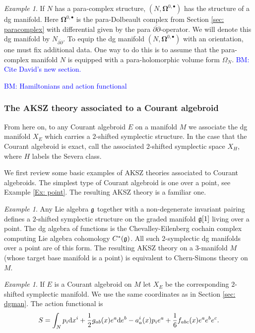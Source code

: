 \documentclass{article}
\newcommand{\p}{\partial}
\newcommand{\pd}{\overline{\p\!\!\!\p}}
\def\d{{\rm d}}
\theoremstyle{definition}
\theoremstyle{remark}
\newtheorem{Ex}[theorem]{Example}
\def\brian{\textcolor{blue}{BM: }\textcolor{blue}}
\begin{document}
\begin{Ex}
If $N$ has a para-complex structure, $(N, \mathbf{\Omega}^{0,\bullet})$ has the structure of a dg manifold. 
Here $\mathbf{\Omega}^{0,\bullet}$ is the para-Dolbeault complex from Section \ref{sec: paracomplex} with differential given by the para $\pd$-operator. 
We will denote this dg manifold by $N_{\pd}$. 
To equip the dg manifold $(N, \mathbf{\Omega}^{0,\bullet})$ with an orientation, one must fix additional data. 
One way to do this is to assume that the para-complex manifold $N$ is equipped with a para-holomorphic volume form $\Omega_N$. \brian{Cite David's new section.}
\end{Ex}

\brian{Hamiltonians and action functional}

\subsubsection{The AKSZ theory associated to a Courant algebroid}

From here on, to any Courant algebroid $E$ on a manifold $M$ we associate the dg manifold $X_E$ which carries a $2$-shifted symplectic structure. 
In the case that the Courant algebroid is exact, call the associated $2$-shifted symplectic space $X_H$, where $H$ labels the Severa class. 

We first review some basic examples of AKSZ theories associated to Courant algebroids. 
The simplest type of Courant algebroid is one over a point, see Example \ref{Ex: point}. 
The resulting AKSZ theory is a familiar one.

\begin{Ex}\label{ex: cs}
Any Lie algebra $\mathfrak{g}$ together with a non-degenerate invariant pairing defines a $2$-shifted symplectic structure on the graded manifold $\mathfrak{g}[1]$ living over a point. 
The dg algebra of functions is the Chevalley-Eilenberg cochain complex computing Lie algebra cohomology $C^*(\mathfrak{g})$. 
All such $2$-symplectic dg manifolds over a point are of this form. 
The resulting AKSZ theory on a $3$-manifold $M$ (whose target base manifold is a point) is equivalent to Chern-Simons theory on $M$. 
\end{Ex}

\begin{Ex} \label{ex: exact CA}
If $E$ is a Courant algebroid on $M$ let $X_E$ be the corresponding $2$-shifted symplectic manifold.
We use the same coordinates as in Section \ref{sec: dgman}.
The action functional is
\[
S = \int_N p_i \d x^i + \frac{1}{2} g_{ab}(x) e^a \d e^b - a_a^i(x) p_i e^a + \frac{1}{6} f_{abc} (x) e^{a} e^b e^c .
\]
\end{Ex}
\end{document}
